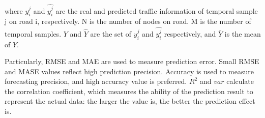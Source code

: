 \documentclass[10pt,journal,compsoc]{IEEEtran}
\begin{document}
where $y_{i}^{j}$ and $\widehat{y_{i}^{j}}$ are the real and predicted traffic information of temporal sample j on road i, respectively. N is the number of nodes on road. M is the number of temporal samples. $Y$ and $\widehat{Y}$ are the set of $y_{i}^{j}$ and $\widehat{y_{i}^{j}}$ respectively, and $\bar{Y}$ is the mean of $Y$.

Particularly, RMSE and MAE are used to measure prediction error. Small RMSE and MASE values reflect high prediction precision. Accuracy is used to measure forecasting precision, and high accuracy value is preferred. $R^{2}$ and $var$ calculate the correlation coefficient, which measures the ability of the prediction result to represent the actual data: the larger the value is, the better the prediction effect is.


\end{document}
